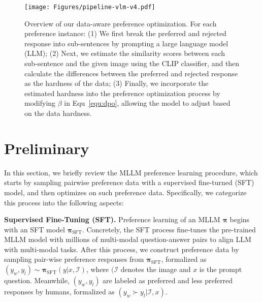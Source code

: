 \begin{figure*}[t]
\vskip 0.2in
\begin{center}
\centerline{\texttt{[image: Figures/pipeline-vlm-v4.pdf]}}
\caption{Overview of our data-aware preference optimization. For each preference instance: (1) We first break the preferred and rejected response into sub-sentences by prompting a large language model (LLM); 
(2) Next, we estimate the similarity scores between each sub-sentence and the given image using the CLIP classifier, and then calculate the differences between the preferred and rejected response as the hardness of the data; 
(3) Finally, we incorporate the estimated hardness into the preference optimization process by modifying $\beta$ in Equ~\eqref{equ:dpo}, allowing the model to adjust based on the data hardness.}
\label{fig:pipleine-vlm}
\end{center}
\vskip -0.2in
\end{figure*}


\section{Preliminary}
\label{sec:preliminary}
In this section, we briefly review the MLLM preference learning procedure, which starts by sampling pairwise preference data with a supervised fine-turned (SFT) model, and then optimizes on such preference data. Specifically, we categorize this process into the following aspects:

\noindent \textbf{Supervised Fine-Tuning (SFT).}
Preference learning of an MLLM $\bm{\pi}$ begins with an SFT model $\bm{\pi}_{\text{SFT}}$. Concretely, the SFT process fine-tunes the pre-trained MLLM model with millions of multi-modal question-answer pairs to align LLM with multi-modal tasks. 
After this process, we construct preference data by sampling pair-wise preference responses from $\bm{\pi}_{\mathrm{SFT}}$, formalized as $(y_w, y_l) \sim \bm{\pi}_{\mathrm{SFT}}(y|x,\mathcal{I})$, where $(\mathcal{I}$ denotes the image and $x$ is the prompt question. 
Meanwhile, $(y_w, y_l)$ are labeled as preferred and less preferred responses by humans, formalized as $(y_w \succ  y_l | \mathcal{I}, x)$.

